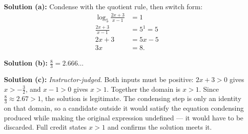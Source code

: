 \documentclass[12pt]{article}
\begin{document}
\textbf{Solution (a):} Condense with the quotient rule, then switch form:
\begin{align*}
  \log_5\!\frac{2x+3}{x-1} &= 1 \\
  \frac{2x+3}{x-1} &= 5^1 = 5 \\
  2x + 3 &= 5x - 5 \\
  3x &= 8 .
\end{align*}

\textbf{Solution (b):} $\tfrac{8}{3} = 2.666\ldots$ 

\textbf{Solution (c):} \emph{Instructor-judged.} Both inputs must be positive:
$2x + 3 > 0$ gives $x > -\tfrac{3}{2}$, and $x - 1 > 0$ gives $x > 1$. Together
the domain is $x > 1$. Since $\tfrac{8}{3} \approx 2.67 > 1$, the solution is
legitimate. The condensing step is only an identity on that domain, so a
candidate outside it would satisfy the equation condensing produced while making
the original expression undefined --- it would have to be discarded. Full credit
states $x > 1$ and confirms the solution meets it.
\end{document}

